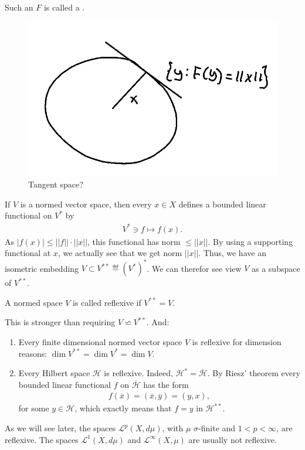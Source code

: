 Such an \(F\) is called a .
\begin{figure}[H]
    \centering
    \includegraphics[scale=0.4]{../Figs/hanah_banach1.png}
    \caption{Tangent space?}
\end{figure}
If \(V\) is a normed vector space, then every \(x\in X\) defines a bounded linear functional on \(V^*\) by 
\begin{align*}
    V^*\ni f\mapsto f(x).
\end{align*}
As \(|f(x)|\leq ||f||\cdot ||x||\), this functional has norm \(\leq ||x||\). By using a supporting functional at \(x\), we actually see that
we get norm \(||x||\). Thus, we have an isometric embedding \(V\subset V^{**}\eqdef (V^*)^*\). We can therefor see view \(V\) as a subspace
of \(V^{**}\).
\begin{definition}
    A normed space \(V\) is called reflexive if \(V^{**}=V\).
\end{definition}
\begin{remark}
    This is stronger than requiring \(V\backsimeq V^{**}\). And:
    \begin{enumerate}[label=(\roman*)]
    \item Every finite dimensional normed vector space \(V\) is reflexive for dimension reasons: \(\dim V^{**} = \dim V^*=\dim V\).
    \item Every Hilbert space \(\mathcal{H}\) is reflexive. Indeed, \(\mathcal{H}^*=\overline{\mathcal{H}}\). By Riesz' theorem every bounded linear 
    functional \(f\) on \(\overline{\mathcal{H}}\) has the form
    \begin{align*}
        f(\overline{x}) = (\overline{x}, \overline{y}) = (y,x),
    \end{align*}
    for some \(y\in\mathcal{H}\), which exactly means that \(f=y\) in \(\mathcal{H}^{**}\).
    \end{enumerate}
\end{remark}
As we will see later, the spaces \(\mathcal{L}^{p}(X,d\mu)\), with \(\mu\) \(\sigma\)-finite and \(1<p<\infty\), are reflexive. The spaces
\(\mathcal{L}^{1}(X, d\mu)\) and \(\mathcal{L}^{\infty}(X,\mu)\) are usually not reflexive.
